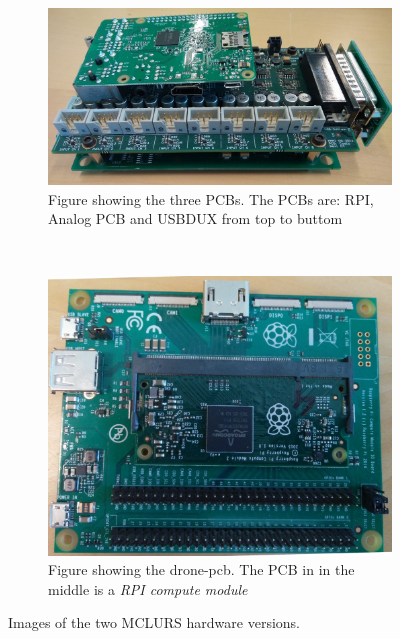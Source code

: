 \begin{figure}
    \centering
    \begin{subfigure}[b]{0.45\textwidth}
        \includegraphics[width=\textwidth]{figures/batbox}
        \caption{Figure showing the three PCBs. The PCBs are: RPI, Analog PCB and USBDUX from top to buttom}
        \label{fig:gull}
    \end{subfigure}
    ~ %
    \begin{subfigure}[b]{0.45\textwidth}
        \includegraphics[width=\textwidth]{figures/drone_pcb}
        \caption{Figure showing the drone-pcb. The PCB in in the middle is a \textit{RPI compute module}}
        \label{fig:mouse}
    \end{subfigure}
    \caption{Images of the two MCLURS hardware versions.}\label{fig:intro:batbox}
\end{figure}


